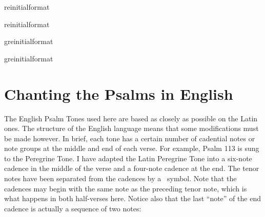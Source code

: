\documentclass[12pt]{article} %
\newcommand{\myaboveinitial}[1]{%
    \expandafter\renewcommand\csname greinitialformat\endcsname[1]{%
        \fontsize{43}{43}\selectfont ##1
    }
    \gresetfirstlineaboveinitial{\textcolor{benred8}{\raisebox{6.0mm}{\small \textsc{\textbf{#1}}}}}{}
}
\newenvironment{response}{\leftskip 0in \setlength{\parindent}{0in}}{\vspace{1 mm}}
\def\pipe{\textcolor{benred8}{\textdoublepipe}}
\begin{document}
\thispagestyle{plain}


{\grespacelinestext=7.5mm
\myaboveinitial{V}

}

\vspace{2mm}


\myaboveinitial{VI}

\vspace{2mm}


\myaboveinitial{VI}

\vspace{2mm}


\myaboveinitial{V}

\vspace{2mm}

\newpage


\section*{Chanting the Psalms in English}

\thispagestyle{plain}

\begin{response}
The English Psalm Tones used here are based as closely as possible on the Latin ones. The structure of the English language means that some modifications must be made however. In brief, each tone has a certain number of cadential notes or note groups at the middle and end of each verse. For example, Psalm 113 is sung to the Peregrine Tone. I have adapted the Latin Peregrine Tone into a six-note cadence in the middle of the verse and a four-note cadence at the end. The tenor notes have been separated from the cadences by a \pipe\ symbol. Note that the cadences may begin with the same note as the preceding tenor note, which is what happens in both half-verses here. Notice also that the last ``note'' of the end cadence is actually a sequence of two notes:

\end{response}
\end{document}
